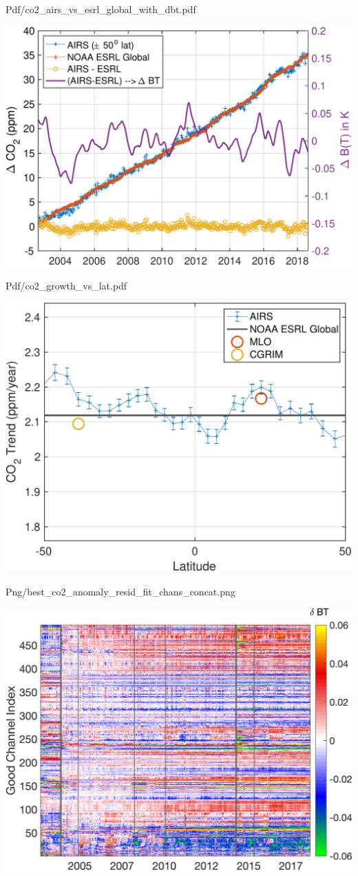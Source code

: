 \documentclass[presentation]{beamer}
\begin{document}
\begin{frame}[label={sec:orgaf32f3e}]{Pdf/co2\_airs\_vs\_esrl\_global\_with\_dbt.pdf}
\begin{center}
\includegraphics[width=0.7\linewidth]{./Figs/Pdf/co2_airs_vs_esrl_global_with_dbt.pdf}
\end{center}
\end{frame}

\begin{frame}[label={sec:org1d4f9d6}]{Pdf/co2\_growth\_vs\_lat.pdf}
\begin{center}
\includegraphics[width=0.7\linewidth]{./Figs/Pdf/co2_growth_vs_lat.pdf}
\end{center}
\end{frame}

\begin{frame}[label={sec:orgf82945e}]{Png/best\_co2\_anomaly\_resid\_fit\_chans\_concat.png}
\begin{center}
\includegraphics[width=0.7\linewidth]{./Figs/Png/best_co2_anomaly_resid_fit_chans_concat.png}
\end{center}
\end{frame}
\end{document}
